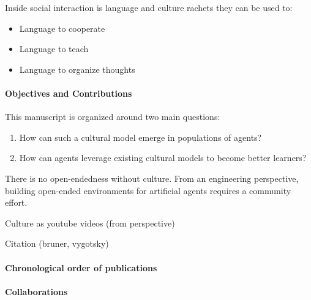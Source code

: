 Inside social interaction is language and culture rachets they can be used to:
\begin{itemize}[noitemsep]
\item Language to cooperate
\item Language to teach \cite{sigaud2021towards}
\item Language to organize thoughts	
\end{itemize}


\paragraph{Objectives and Contributions}

This manuscript is organized around two main questions:
%
\begin{enumerate}[noitemsep]
	\item How can such a cultural model emerge in populations of agents?
	\item How can agents leverage existing cultural models to become better learners? 
\end{enumerate}

There is no open-endedness without culture. From an engineering perspective, building open-ended environments for artificial agents requires a community effort.

Culture as youtube videos (from perspective)

Citation (bruner, vygotsky)

\clearpage

\paragraph{Chronological order of publications}

\paragraph{Collaborations}



